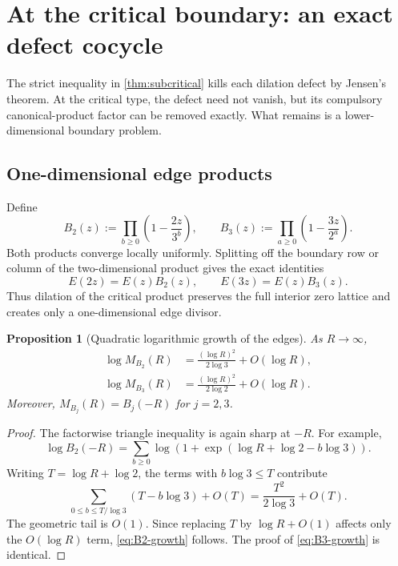 \documentclass[11pt,oneside]{article}
\newtheorem{proposition}[theorem]{Proposition}
\theoremstyle{definition}
\theoremstyle{remark}
\begin{document}
\section{At the critical boundary: an exact defect cocycle}
\label{sec:critical-cocycle}

The strict inequality in \cref{thm:subcritical} kills each dilation defect by Jensen's theorem.  At the critical type, the defect need not vanish, but its compulsory canonical-product factor can be removed exactly.  What remains is a lower-dimensional boundary problem.

\subsection{One-dimensional edge products}

Define
\begin{equation}
  B_2(z):=\prod_{b\ge0}\left(1-\frac{2z}{3^b}\right),
  \qquad
  B_3(z):=\prod_{a\ge0}\left(1-\frac{3z}{2^a}\right).
  \label{eq:edge-products}
\end{equation}
Both products converge locally uniformly.  Splitting off the boundary row or column of the two-dimensional product gives the exact identities
\begin{equation}
  E(2z)=E(z)B_2(z),
  \qquad
  E(3z)=E(z)B_3(z).
  \label{eq:E-dilation-edge}
\end{equation}
Thus dilation of the critical product preserves the full interior zero lattice and creates only a one-dimensional edge divisor.

\begin{proposition}[Quadratic logarithmic growth of the edges]
\label{prop:edge-growth}
As \(R\to\infty\),
\begin{align}
  \log M_{B_2}(R)
    &=\frac{(\log R)^2}{2\log3}+O(\log R),
    \label{eq:B2-growth}\\
  \log M_{B_3}(R)
    &=\frac{(\log R)^2}{2\log2}+O(\log R).
    \label{eq:B3-growth}
\end{align}
Moreover, \(M_{B_j}(R)=B_j(-R)\) for \(j=2,3\).
\end{proposition}

\begin{proof}
The factorwise triangle inequality is again sharp at \(-R\).  For example,
\[
  \log B_2(-R)
   =\sum_{b\ge0}\log\left(1+\exp(\log R+\log2-b\log3)\right).
\]
Writing \(T=\log R+\log2\), the terms with \(b\log3\le T\) contribute
\[
  \sum_{0\le b\le T/\log3}(T-b\log3)+O(T)
  =\frac{T^2}{2\log3}+O(T).
\]
The geometric tail is \(O(1)\).  Since replacing \(T\) by \(\log R+O(1)\) affects only the \(O(\log R)\) term, \eqref{eq:B2-growth} follows.  The proof of \eqref{eq:B3-growth} is identical.
\end{proof}
\end{document}
